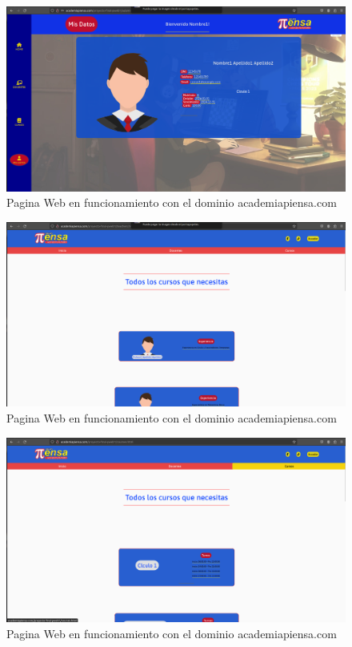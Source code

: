 \begin{figure}[H]
  \centering
  \includegraphics[width=1.0\textwidth]{img/AulaVirtual4.png}
  \caption{Pagina Web en funcionamiento con el dominio academiapiensa.com}
\end{figure}
\begin{figure}[H]
  \centering
  \includegraphics[width=1.0\textwidth]{img/Profesores.png}
  \caption{Pagina Web en funcionamiento con el dominio academiapiensa.com}
\end{figure}
\begin{figure}[H]
  \centering
  \includegraphics[width=1.0\textwidth]{img/Cursos.png}
  \caption{Pagina Web en funcionamiento con el dominio academiapiensa.com}
\end{figure}